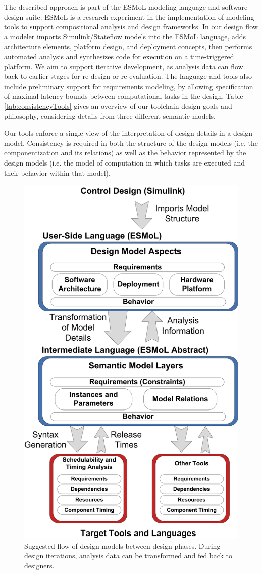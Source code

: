 The described approach is part of the ESMoL modeling language and software design 
suite\cite{modeling:aces08}.  ESMoL is a research experiment in the implementation of modeling 
tools to support compositional analysis and design frameworks.  In our design flow a modeler 
imports Simulink/Stateflow models \cite{tools:mathworks} into the ESMoL language, adds architecture 
elements, platform design, and deployment concepts, then performs automated analysis and synthesizes 
code for execution on a time-triggered platform.  We aim to support iterative
development, as analysis data can flow back to earlier stages for re-design or
re-evaluation.  The language and tools also include preliminary support for
requirements modeling, by allowing specification of maximal latency 
bounds between computational tasks in the design. Table
\ref{tab:consistencyTools} gives an overview of our toolchain design goals and
philosophy, considering details from three different semantic models.

Our tools enforce a single view of the interpretation of design details in a
design model. Consistency is required in both the structure of the design models
(i.e. the componentization and its relations) as well as the behavior
represented by the design models (i.e. the model of computation in which tasks
are executed and their behavior within that model). 

\begin{figure}
\centering
\includegraphics[width=0.5\columnwidth]{figures/designflow.png}
    \caption{Suggested flow of design models between design phases. During
design iterations, analysis data can be transformed and fed back to designers. }
    \label{fig:designflow}
\end{figure}

